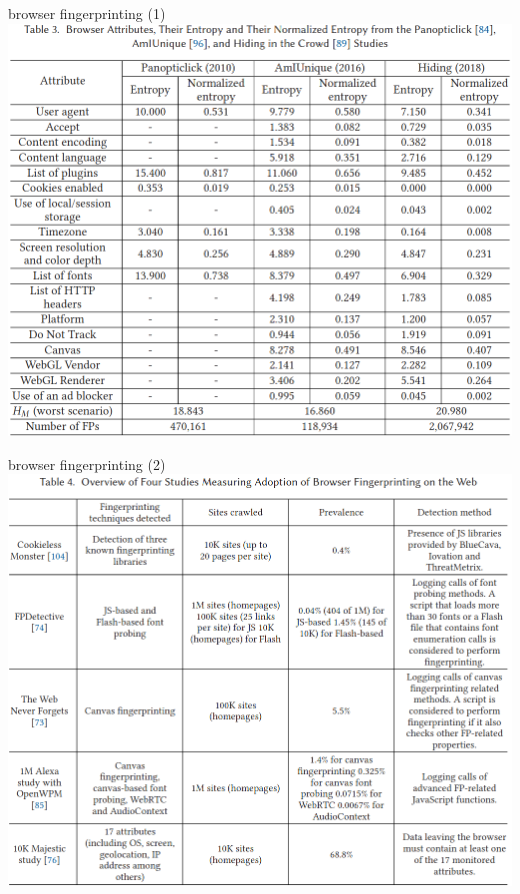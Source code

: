 \begin{frame}{browser fingerprinting (1)}
\includegraphics[height=0.85\textheight]{../web/browser-fp-survey-tbl3}
\end{frame}

\begin{frame}{browser fingerprinting (2)}
\includegraphics[height=0.85\textheight]{../web/browser-fp-survey-tbl4}
\end{frame}
